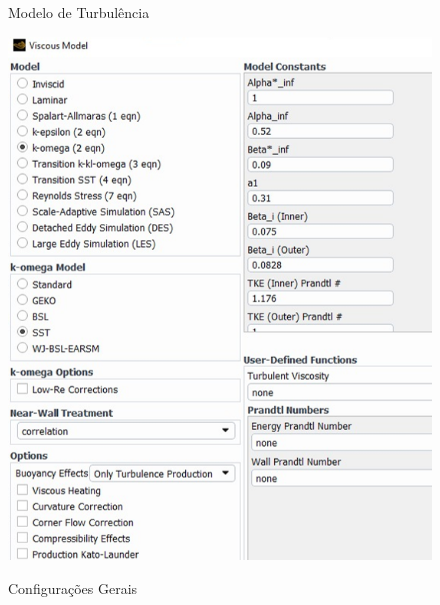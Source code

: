 \documentclass[acronym,symbols,table]{fei}
\begin{document}
\begin{figure}[!htp]
	\centering
	\begin{minipage}{0.5\textwidth}
	    \centering
		\caption{Modelo de Turbulência}
		\includegraphics[width=1\linewidth]{Imagens/omega.png}
		\label{fig:K-Omega}
	\end{minipage}\hfill
	\begin{minipage}{0.5\textwidth}
	    \centering
		\caption{Configurações Gerais}

\end{minipage}
\end{figure}
\end{document}
